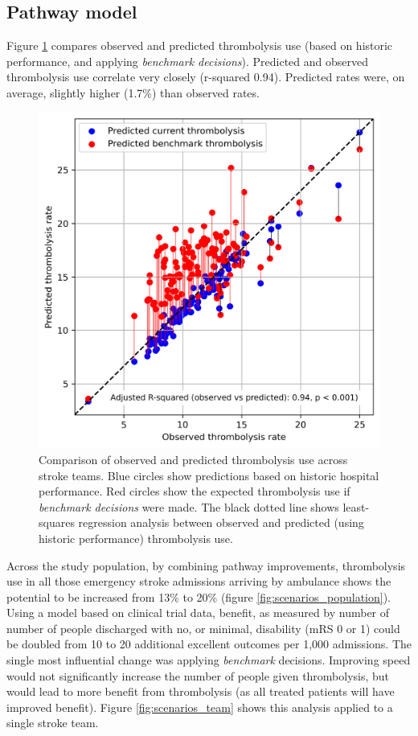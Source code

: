 \normalsize

\subsection{Pathway model}

Figure \ref{fig:thrombolysis_rates_teams} compares observed and predicted thrombolysis use (based on historic performance, and applying \textit{benchmark decisions}). Predicted and observed thrombolysis use correlate very closely (r-squared 0.94). Predicted rates were, on average, slightly higher (1.7\%) than observed rates.

\begin{figure}[!h]
    \centering
    \includegraphics[width=0.5\linewidth]{images/thrombolysis_rates_model}
    \caption{Comparison of observed and predicted thrombolysis use across stroke teams. Blue circles show predictions based on historic hospital performance. Red circles show the expected thrombolysis use if \textit{benchmark decisions} were made. The black dotted line shows least-squares regression analysis between observed and predicted (using historic performance) thrombolysis use.}
    \label{fig:thrombolysis_rates_teams}
\end{figure}


Across the study population, by combining pathway improvements, thrombolysis use in all those emergency stroke admissions arriving by ambulance shows the potential to be increased from 13\% to 20\% (figure \ref{fig:scenarios_population}). Using a model based on clinical trial data, benefit, as measured by number of number of people discharged with no, or minimal, disability (mRS 0 or 1)  could be doubled from 10 to 20 additional excellent outcomes per 1,000 admissions. The single most influential change was applying \textit{benchmark} decisions. Improving speed would not significantly increase the number of people given thrombolysis, but would lead to more benefit from thrombolysis (as all treated patients will have improved benefit). Figure \ref{fig:scenarios_team} shows this analysis applied to a single stroke team.


